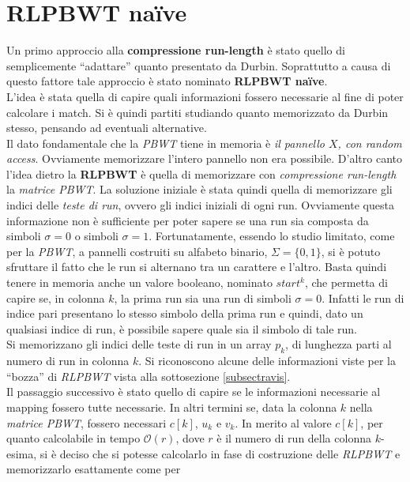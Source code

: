 \section{RLPBWT na\"{i}ve}
\label{secrlpbwtna\"{i}ve}
Un primo approccio alla \textbf{compressione run-length} è stato quello di
semplicemente ``adattare'' quanto presentato da Durbin. Soprattutto a causa di
questo fattore tale approccio è stato nominato \textbf{RLPBWT na\"{i}ve}.\\
L'idea è stata quella di capire quali informazioni fossero necessarie al fine di
poter calcolare i match. Si è quindi partiti studiando quanto memorizzato da
Durbin stesso, pensando ad eventuali alternative.\\
Il dato fondamentale che la \textit{PBWT} tiene in memoria è \textit{il pannello
  $X$, con random access}. Ovviamente memorizzare l'intero pannello non era
possibile. D'altro canto l'idea dietro la 
\textbf{RLPBWT} è quella di memorizzare con \textit{compressione run-length}
la \textit{matrice PBWT}. La soluzione iniziale è stata quindi quella di
memorizzare gli indici delle \textit{teste di run}, ovvero gli indici iniziali
di ogni run. Ovviamente questa informazione non è sufficiente per poter sapere
se una run sia composta da simboli $\sigma=0$ o simboli
$\sigma=1$. Fortunatamente, essendo lo studio limitato, come per la
\textit{PBWT}, a pannelli costruiti su alfabeto binario, $\Sigma=\{0,1\}$, si è
potuto sfruttare il fatto che le run si alternano tra un carattere e
l'altro. Basta quindi tenere in memoria anche un valore booleano, nominato
$start^k$, che permetta di 
capire se, in colonna $k$, la prima run sia una run di simboli
$\sigma=0$. Infatti le run di 
indice pari presentano lo stesso simbolo della prima run e quindi, dato un
qualsiasi indice di run, è possibile sapere quale sia il simbolo di tale run.\\
Si memorizzano gli indici delle teste di run in un array $p_k$, di lunghezza
parti al numero di run in colonna $k$. Si riconoscono alcune delle informazioni
viste per la ``bozza'' di \textit{RLPBWT} vista alla sottosezione
\ref{subsectravis}.\\ 
Il passaggio successivo è stato quello di capire se le informazioni necessarie
al mapping fossero tutte necessarie. In altri termini se, data la colonna $k$
nella \textit{matrice PBWT}, fossero necessari $c[k]$, $u_k$ e $v_k$. In merito
al valore $c[k]$, per quanto calcolabile in tempo $\mathcal{O}(r)$, dove $r$ è
il numero di run della colonna $k$-esima, si è deciso che si potesse calcolarlo
in fase di costruzione delle \textit{RLPBWT} e memorizzarlo esattamente come per
